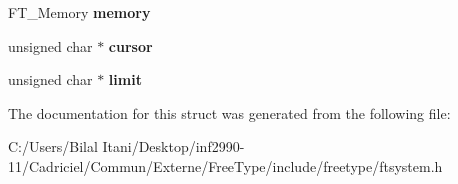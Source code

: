 \begin{DoxyCompactItemize}
\item 
F\+T\+\_\+\+Memory {\bfseries memory}\hypertarget{struct_f_t___stream_rec___a51e2be0d80d70b532aae3face5461e7e}{}\label{struct_f_t___stream_rec___a51e2be0d80d70b532aae3face5461e7e}

\item 
unsigned char $\ast$ {\bfseries cursor}\hypertarget{struct_f_t___stream_rec___ab7dbbad87d8b6d0178771a06e1ce8b4d}{}\label{struct_f_t___stream_rec___ab7dbbad87d8b6d0178771a06e1ce8b4d}

\item 
unsigned char $\ast$ {\bfseries limit}\hypertarget{struct_f_t___stream_rec___aff006e6ee3bbc2741a2c4ae79b1bad3a}{}\label{struct_f_t___stream_rec___aff006e6ee3bbc2741a2c4ae79b1bad3a}

\end{DoxyCompactItemize}


The documentation for this struct was generated from the following file\+:\begin{DoxyCompactItemize}
\item 
C\+:/\+Users/\+Bilal Itani/\+Desktop/inf2990-\/11/\+Cadriciel/\+Commun/\+Externe/\+Free\+Type/include/freetype/ftsystem.\+h\end{DoxyCompactItemize}
